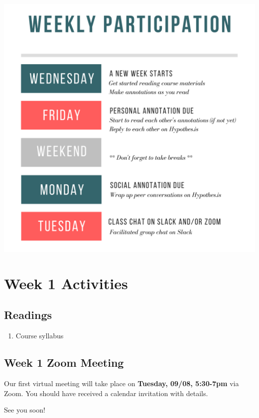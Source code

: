 \documentclass[
]{book}
\providecommand{\tightlist}{%
  \setlength{\itemsep}{0pt}\setlength{\parskip}{0pt}}
\begin{document}
\includegraphics{img/weekly-schedule.png}

\hypertarget{week-1-activities}{%
\section{Week 1 Activities}\label{week-1-activities}}

\hypertarget{readings}{%
\subsection{Readings}\label{readings}}

\begin{enumerate}
\def\labelenumi{\arabic{enumi}.}
\tightlist
\item
  Course syllabus
\end{enumerate}

\hypertarget{week-1-zoom-meeting}{%
\subsection{Week 1 Zoom Meeting}\label{week-1-zoom-meeting}}

Our first virtual meeting will take place on \textbf{Tuesday, 09/08, 5:30-7pm} via Zoom. You should have received a calendar invitation with details.

See you soon!
\end{document}
